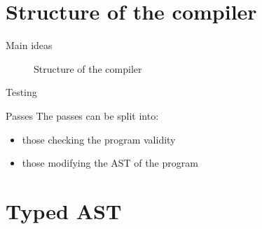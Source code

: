 \documentclass{beamer}
\begin{document}
\section{Structure of the compiler}
\begin{frame}{Main ideas}
	\begin{figure}
		\caption{Structure of the compiler}
	\end{figure}
\end{frame}

\begin{frame}{Testing}
	\begin{block}{Passes}
		The passes can be split into:
		\begin{itemize}
			\item those checking the program validity
			\item those modifying the AST of the program
		\end{itemize}
	\end{block}
\end{frame}

\section{Typed AST}
\end{document}

